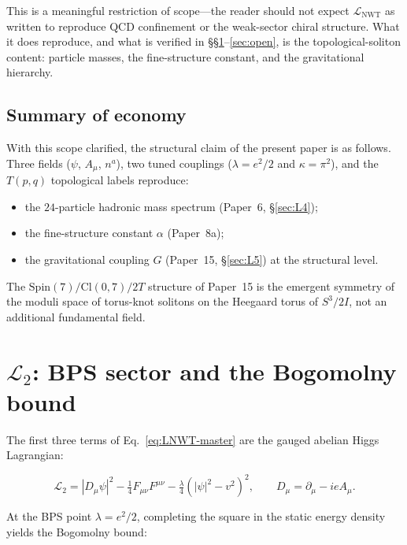 \documentclass[11pt]{article}
\newcommand{\Lnwt}{\mathcal{L}_\text{NWT}}
\begin{document}
This is a meaningful restriction of scope---the reader should not
expect $\Lnwt$ as written to reproduce QCD confinement or the
weak-sector chiral structure.  What it does reproduce, and what
is verified in \S\S\ref{sec:L2}--\ref{sec:open}, is the
topological-soliton content: particle masses, the fine-structure
constant, and the gravitational hierarchy.

\subsection{Summary of economy}
\label{sec:L1-economy}

With this scope clarified, the structural claim of the present
paper is as follows.  Three fields ($\psi$, $A_\mu$, $n^a$), two
tuned couplings ($\lambda = e^2/2$ and $\kappa = \pi^2$), and the
$T(p, q)$ topological labels reproduce:
\begin{itemize}\setlength\itemsep{0pt}
  \item the $24$-particle hadronic mass spectrum (Paper~6,
    \S\ref{sec:L4});
  \item the fine-structure constant $\alpha$ (Paper~8a);
  \item the gravitational coupling $G$ (Paper~15, \S\ref{sec:L5})
    at the structural level.
\end{itemize}
The $\mathrm{Spin}(7) / \mathrm{Cl}(0,7) / 2T$ structure of
Paper~15 is the emergent symmetry of the moduli space of
torus-knot solitons on the Heegaard torus of $S^3/2I$, not an
additional fundamental field.

\section{$\mathcal{L}_2$: BPS sector and the Bogomolny bound}
\label{sec:L2}

The first three terms of Eq.~\ref{eq:LNWT-master} are the gauged
abelian Higgs Lagrangian:

\begin{equation}
  \mathcal{L}_2
    = |D_\mu \psi|^2  -  \tfrac{1}{4} F_{\mu\nu} F^{\mu\nu}
    -  \tfrac{\lambda}{4} (|\psi|^2 - v^2)^2 ,
  \qquad
  D_\mu = \partial_\mu - i e A_\mu .
\end{equation}

At the BPS point $\lambda = e^2/2$, completing the square in the
static energy density yields the Bogomolny bound:
\end{document}
